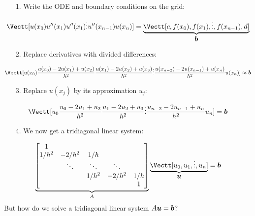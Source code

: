 \begin{itemize}
\item[1. ] Write the ODE and boundary conditions on the grid:

\end{itemize}
\[
\Vectt[u(x_0) \\ 
u''(x_1) \\
u''(x_1) \\
\ensuremath{\vdots} \\
u''(x_{n-1}) \\
u(x_n)] = \underbrace{\Vectt[c, f(x_0), f(x_1), \ensuremath{\vdots} , f(x_{n-1}), d]}_{\ensuremath{\bm{\b}}}
\]
\begin{itemize}
\item[2. ] Replace derivatives with divided differences:

\end{itemize}
\[
\Vectt[u(x_0) \\ 
{u(x_0) - 2u(x_1) + u(x_2)\over h^2} \\
{u(x_1) - 2u(x_2) + u(x_3)\over h^2} \\
\ensuremath{\vdots} \\
{u(x_{n-2}) - 2u(x_{n-1}) + u(x_n)\over h^2} \\
u(x_n)] \ensuremath{\approx} \ensuremath{\bm{\b}}
\]
\begin{itemize}
\item[3. ] Replace $u(x_j)$  by its approximation $u_j$:

\end{itemize}
\[
\Vectt[u_0 \\ 
{u_0 - 2u_1 + u_2\over h^2} \\
{u_1 - 2u_2 + u_3\over h^2} \\
\ensuremath{\vdots} \\
{u_{n-2} - 2u_{n-1} + u_n\over h^2} \\
u_n] = \ensuremath{\bm{\b}}
\]
\begin{itemize}
\item[4. ] We now get a tridiagonal linear system:

\end{itemize}
\[
\underbrace{\begin{bmatrix}
    1 \\ 
    1/h^2 & -2/h^2 & 1/h \\
    & \ensuremath{\ddots} & \ensuremath{\ddots} & \ensuremath{\ddots} \\
   && 1/h^2 & -2/h^2 & 1/h \\ 
   &&&& 1 \end{bmatrix}}_A \underbrace{\Vectt[u_0,u_1,\ensuremath{\vdots},u_n]}_{\ensuremath{\bm{\u}}} = \ensuremath{\bm{\b}}
\]
But how do we solve a tridiagonal linear system $A \bm{{\mbox{\boldmath$u$\unboldmath}}} = \bm{{\mbox{\boldmath$b$\unboldmath}}}$?



